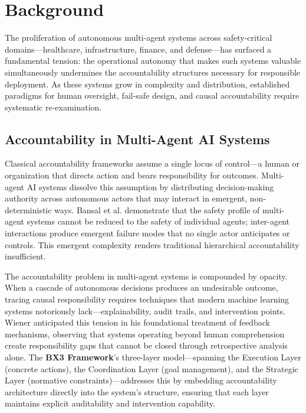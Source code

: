 \section{Background}

The proliferation of autonomous multi-agent systems across safety-critical domains—healthcare, infrastructure, finance, and defense—has surfaced a fundamental tension: the operational autonomy that makes such systems valuable simultaneously undermines the accountability structures necessary for responsible deployment. As these systems grow in complexity and distribution, established paradigms for human oversight, fail-safe design, and causal accountability require systematic re-examination.

\subsection{Accountability in Multi-Agent AI Systems}

Classical accountability frameworks assume a single locus of control—a human or organization that directs action and bears responsibility for outcomes. Multi-agent AI systems dissolve this assumption by distributing decision-making authority across autonomous actors that may interact in emergent, non-deterministic ways. Bansal et al. \cite{bansal2019} demonstrate that the safety profile of multi-agent systems cannot be reduced to the safety of individual agents; inter-agent interactions produce emergent failure modes that no single actor anticipates or controls. This emergent complexity renders traditional hierarchical accountability insufficient.

The accountability problem in multi-agent systems is compounded by opacity. When a cascade of autonomous decisions produces an undesirable outcome, tracing causal responsibility requires techniques that modern machine learning systems notoriously lack—explainability, audit trails, and intervention points. Wiener \cite{wiener1948} anticipated this tension in his foundational treatment of feedback mechanisms, observing that systems operating beyond human comprehension create responsibility gaps that cannot be closed through retrospective analysis alone. The \textbf{BX3 Framework}'s three-layer model—spanning the Execution Layer (concrete actions), the Coordination Layer (goal management), and the Strategic Layer (normative constraints)—addresses this by embedding accountability architecture directly into the system's structure, ensuring that each layer maintains explicit auditability and intervention capability.

